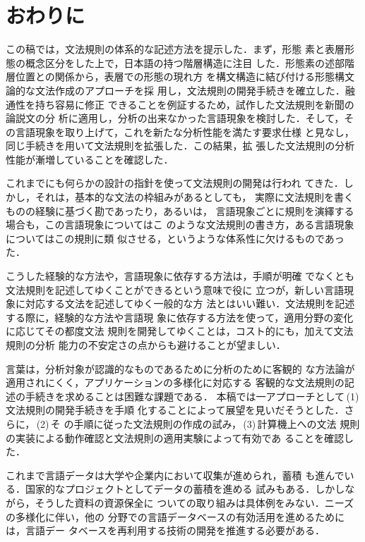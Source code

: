\section{おわりに}

この稿では，文法規則の体系的な記述方法を提示した．まず，形態
素と表層形態の概念区分をした上で，日本語の持つ階層構造に注目
した．形態素の述部階層位置との関係から，表層での形態の現れ方
を構文構造に結び付ける形態構文論的な文法作成のアプローチを採
用し，文法規則の開発手続きを確立した．融通性を持ち容易に修正
できることを例証するため，試作した文法規則を新聞の論説文の分
析に適用し，分析の出来なかった言語現象を検討した．そして，そ
の言語現象を取り上げて，これを新たな分析性能を満たす要求仕様
と見なし，同じ手続きを用いて文法規則を拡張した．この結果，拡
張した文法規則の分析性能が漸増していることを確認した．

これまでにも何らかの設計の指針を使って文法規則の開発は行われ
てきた．しかし，それは，基本的な文法の枠組みがあるとしても，
実際に文法規則を書くものの経験に基づく勘であったり，あるいは，
言語現象ごとに規則を演繹する場合も，この言語現象についてはこ
のような文法規則の書き方，ある言語現象についてはこの規則に類
似させる，というような体系性に欠けるものであった．

こうした経験的な方法や，言語現象に依存する方法は，手順が明確
でなくとも文法規則を記述してゆくことができるという意味で役に
立つが，新しい言語現象に対応する文法を記述してゆく一般的な方
法とはいい難い．文法規則を記述する際に，経験的な方法や言語現
象に依存する方法を使って，適用分野の変化に応じてその都度文法
規則を開発してゆくことは，コスト的にも，加えて文法規則の分析
能力の不安定さの点からも避けることが望ましい．



言葉は，分析対象が認識的なものであるために分析のために客観的
な方法論が適用されにくく，アプリケーションの多様化に対応する
客観的な文法規則の記述の手続きを求めることは困難な課題である．
本稿では一アプローチとして\,(1)\,文法規則の開発手続きを手順
化することによって展望を見いだそうとした．さらに，\,(2)\,そ
の手順に従った文法規則の作成の試み，\,(3)\,計算機上への文法
規則の実装による動作確認と文法規則の適用実験によって有効であ
ることを確認した．

これまで言語データは大学や企業内において収集が進められ，蓄積
も進んでいる．国家的なプロジェクトとしてデータの蓄積を進める
試みもある\cite{EDR}．しかしながら，そうした資料の資源保全に
ついての取り組みは具体例をみない．ニーズの多様化に伴い，他の
分野での言語データベースの有効活用を進めるためには，言語デー
タベースを再利用する技術の開発を推進する必要がある．

